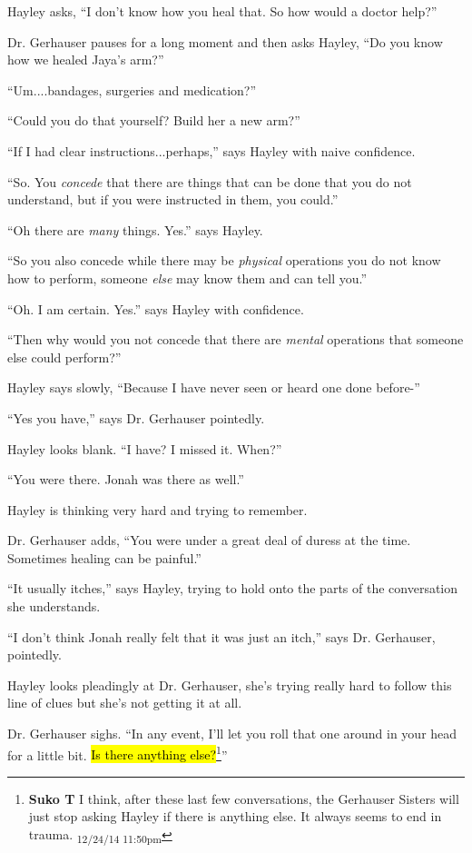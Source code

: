 Hayley asks, ``I don't know how you heal that. So how would a doctor help?''

Dr. Gerhauser pauses for a long moment and then asks Hayley, ``Do you know how we healed Jaya's arm?''

``Um....bandages, surgeries and medication?''

``Could you do that yourself? Build her a new arm?''

``If I had clear instructions...perhaps,'' says Hayley with naive confidence.

``So.  You \textit{concede} that there are things that can be done that you do not understand, but if you were instructed in them, you could.''

``Oh there are \textit{many} things.  Yes.'' says Hayley.

``So you also concede while there may be \textit{physical }operations you do not know how to perform, someone \textit{else} may know them and can tell you.''

``Oh.  I am certain.  Yes.'' says Hayley with confidence.

``Then why would you not concede that there are \textit{mental }operations that someone else could perform?''

Hayley says slowly, ``Because I have never seen or heard one done before-''

``Yes you have,'' says Dr. Gerhauser pointedly.

Hayley looks blank.  ``I have?  I missed it. When?''

``You were there.  Jonah was there as well.''

Hayley is thinking very hard and trying to remember.

Dr. Gerhauser adds, ``You were under a great deal of duress at the time.  Sometimes healing can be painful.''

``It usually itches,'' says Hayley, trying to hold onto the parts of the conversation she understands.

``I don't think Jonah really felt that it was just an itch,'' says Dr. Gerhauser, pointedly.

Hayley looks pleadingly at Dr. Gerhauser, she's trying really hard to follow this line of clues but she's not getting it at all.

Dr. Gerhauser sighs.  ``In any event, I'll let you roll that one around in your head for a little bit.  \hl{Is there anything else?}\footnote{\textbf{Suko T }I think, after these last few conversations, the Gerhauser Sisters will just stop asking Hayley if there is anything else. It always seems to end in trauma. \textsubscript{12/24/14 11:50pm}}''



